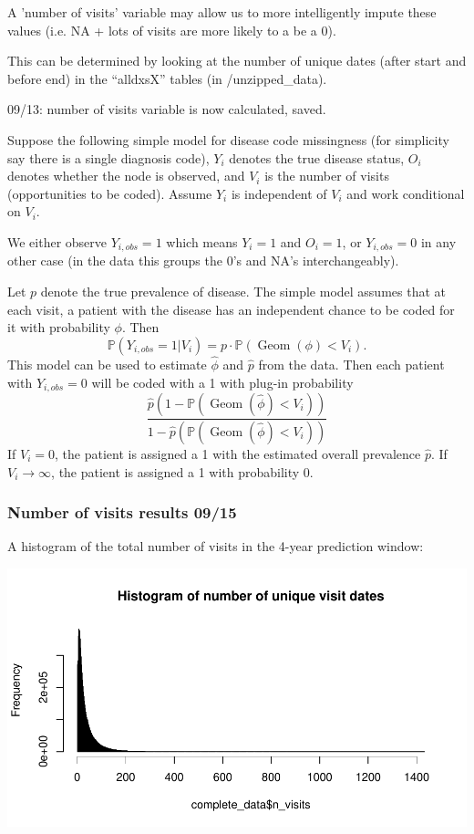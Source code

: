 \documentclass[12pt]{article}
\begin{document}
A 'number of visits' variable may allow us to more intelligently impute these values (i.e. NA + lots of visits are more likely to a be a 0).

This can be determined by looking at the number of unique dates (after start and before end) in the ``alldxsX'' tables (in /unzipped\_data).

09/13: number of visits variable is now calculated, saved.

Suppose the following simple model for disease code missingness (for simplicity say there is a single diagnosis code), $Y_i$ denotes the true disease status, $O_i$ denotes whether the node is observed, and $V_i$ is the number of visits (opportunities to be coded). Assume $Y_i$ is independent of $V_i$ and work conditional on $V_i$.

We either observe $Y_{i,obs} = 1$ which means $Y_i=1$ and $O_i=1$, or $Y_{i,obs} = 0$ in any other case (in the data this groups the 0's and NA's interchangeably).

Let $p$ denote the true prevalence of disease. The simple model assumes that at each visit, a patient with the disease has an independent chance to be coded for it with probability $\phi$. Then
\[
\mathbb{P}(Y_{i,obs}=1 | V_i) = p \cdot \mathbb{P}(\operatorname{Geom}(\phi) < V_i).
\]
This model can be used to estimate $\hat{\phi}$ and $\hat{p}$ from the data. Then each patient with $Y_{i,obs}=0$ will be coded with a 1 with plug-in probability
\[
\frac{\hat{p}\left(1 - \mathbb{P}(\operatorname{Geom}(\hat{\phi}) < V_i) \right)}{1-\hat{p} \left(\mathbb{P}(\operatorname{Geom}(\hat{\phi}) < V_i) \right)}
\]
If $V_i=0$, the patient is assigned a 1 with the estimated overall prevalence $\hat{p}$. If $V_i \rightarrow \infty$, the patient is assigned a 1 with probability 0.

\subsubsection*{Number of visits results 09/15}

A histogram of the total number of visits in the 4-year prediction window:

\begin{center}
\includegraphics[width=.7\textwidth]{nvisits_hist.pdf}
\end{center}
\end{document}

